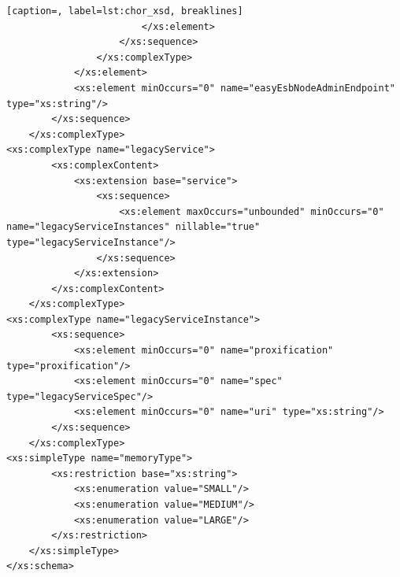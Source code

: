 {\begin{lstlisting}[caption=, label=lst:chor_xsd, breaklines]
                        </xs:element>
                    </xs:sequence>
                </xs:complexType>
            </xs:element>
            <xs:element minOccurs="0" name="easyEsbNodeAdminEndpoint" type="xs:string"/>
        </xs:sequence>
    </xs:complexType>
<xs:complexType name="legacyService">
        <xs:complexContent>
            <xs:extension base="service">
                <xs:sequence>
                    <xs:element maxOccurs="unbounded" minOccurs="0" name="legacyServiceInstances" nillable="true" type="legacyServiceInstance"/>
                </xs:sequence>
            </xs:extension>
        </xs:complexContent>
    </xs:complexType>
<xs:complexType name="legacyServiceInstance">
        <xs:sequence>
            <xs:element minOccurs="0" name="proxification" type="proxification"/>
            <xs:element minOccurs="0" name="spec" type="legacyServiceSpec"/>
            <xs:element minOccurs="0" name="uri" type="xs:string"/>
        </xs:sequence>
    </xs:complexType>
<xs:simpleType name="memoryType">
        <xs:restriction base="xs:string">
            <xs:enumeration value="SMALL"/>
            <xs:enumeration value="MEDIUM"/>
            <xs:enumeration value="LARGE"/>
        </xs:restriction>
    </xs:simpleType>
</xs:schema>
\end{lstlisting}
}

